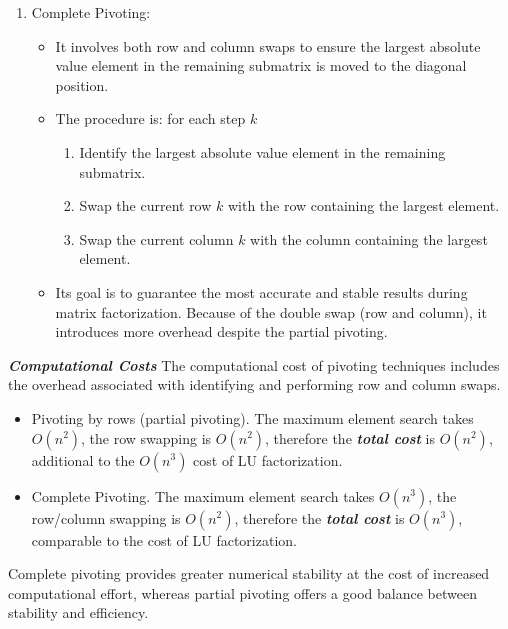 \begin{enumerate}[label=\textcolor{Green3}{\textbf{\arabic*.}}]
\begin{enumerate}
        \item Complete Pivoting:
        \begin{itemize}
            \item It involves both row and column swaps to ensure the largest absolute value element in the remaining submatrix is moved to the diagonal position.
            \item The procedure is: for each step $k$
            \begin{enumerate}
                \item Identify the largest absolute value element in the remaining submatrix.
                \item Swap the current row $k$ with the row containing the largest element.
                \item Swap the current column $k$ with the column containing the largest element.
            \end{enumerate}
            \item Its goal is to guarantee the most accurate and stable results during matrix factorization. Because of the double swap (row and column), it introduces more overhead despite the partial pivoting.
        \end{itemize}
    \end{enumerate}

    \textbf{\emph{Computational Costs}} The computational cost of pivoting techniques includes the overhead associated with identifying and performing row and column swaps.
    \begin{itemize}
        \item Pivoting by rows (partial pivoting). The maximum element search takes $O\left(n^{2}\right)$, the row swapping is $O\left(n^{2}\right)$, therefore the \textbf{\emph{total cost}} is $O\left(n^{2}\right)$, additional to the $O\left(n^{3}\right)$ cost of LU factorization.

        \item Complete Pivoting. The maximum element search takes $O\left(n^{3}\right)$, the row/column swapping is $O\left(n^{2}\right)$, therefore the \textbf{\emph{total cost}} is $O\left(n^{3}\right)$, comparable to the cost of LU factorization.
    \end{itemize}
    Complete pivoting provides greater numerical stability at the cost of increased computational effort, whereas partial pivoting offers a good balance between stability and efficiency.
\end{enumerate}


